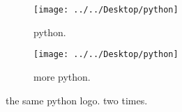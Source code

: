 \documentclass{article}
\begin{document}
	\begin{figure}[h!]
		\centering
		\begin{subfigure}[b]{0.4\linewidth}
			
		\texttt{[image: ../../Desktop/python]}
		    \caption{python.}
		\end{subfigure}
	    \begin{subfigure}[b]{0.4\linewidth}
			
			\texttt{[image: ../../Desktop/python]}
			\caption{more python.}
			\end{subfigure}
		    \caption{the same python logo. two times.}
			\label{fig:python}
		\end{figure}
\end{document}
